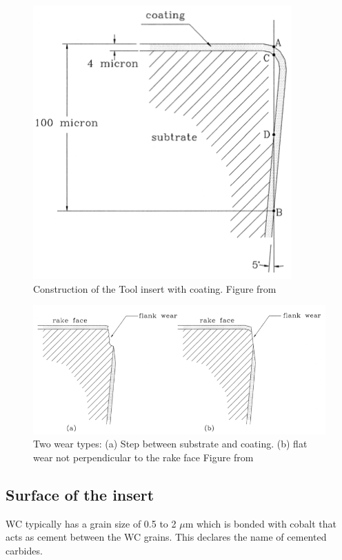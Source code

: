 	
	\begin{figure}[hbtp]
	\centering
	\includegraphics[scale=0.5]{fig/algemeen/plaatjes/Figuren/Insert_construction.png}
	\caption{Construction of the Tool insert with coating. Figure from \citep{Gu1999}}
	\label{fig:alg:insertConstruction}
	\end{figure}
	
	\begin{figure}[hbtp]
	\centering
	\includegraphics[scale=0.4]{fig/algemeen/plaatjes/Figuren/wear_types.png}
	\caption{Two wear types: (a) Step between substrate and coating. (b) flat wear not perpendicular to the rake face Figure from \citep{Gu1999}}
	\label{fig:gen:insertwears}
	\end{figure}

			
\subsection{Surface of the insert}
	WC typically has a grain size of 0.5 to 2 $\mu$m which is bonded with cobalt that acts as cement between the WC grains. This declares the name of cemented carbides.
			
